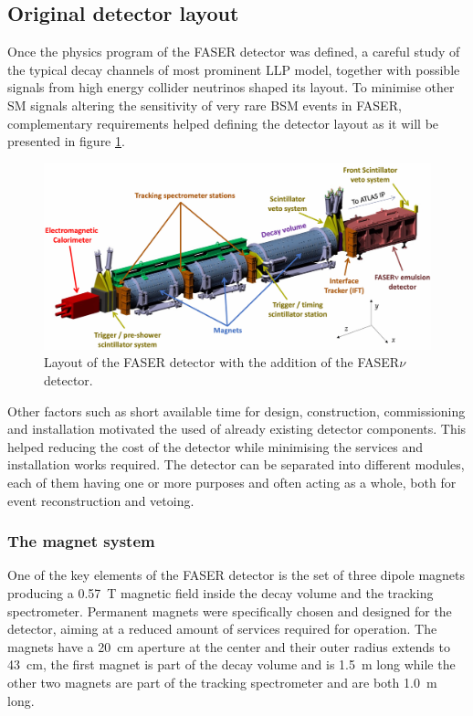 		\subsection{Original detector layout}
		
		Once the physics program of the FASER detector was defined, a careful study of the typical decay channels of most prominent LLP model, together with possible signals from high energy collider neutrinos shaped its layout. To minimise other SM signals altering the sensitivity of very rare BSM events in FASER, complementary requirements helped defining the detector layout as it will be presented in figure \ref{im:FASER_layout}.
			\begin{figure}[h]
				\centering
				\includegraphics[width=0.9\linewidth]{files/FASER_layout}
				\caption{Layout of the FASER detector with the addition of the FASER$\nu$ detector.}
				\label{im:FASER_layout}
			\end{figure}
			
		Other factors such as short available time for design, construction, commissioning and installation motivated the used of already existing detector components. This helped reducing the cost of the detector while minimising the services and installation works required. The detector can be separated into different modules, each of them having one or more purposes and often acting as a whole, both for event reconstruction and vetoing. 
		
			\subsubsection{The magnet system}
			One of the key elements of the FASER detector is the set of three dipole magnets producing a \SI{0.57}{\tesla} magnetic field inside the decay volume and the tracking spectrometer. Permanent magnets were specifically chosen and designed for the detector, aiming at a reduced amount of services required for operation. The magnets have a \SI{20}{\centi\meter} aperture at the center and their outer radius extends to \SI{43}{\centi\meter}, the first magnet is part of the decay volume and is \SI{1.5}{\meter} long while the other two magnets are part of the tracking spectrometer and are both \SI{1.0}{\meter} long. 
				
